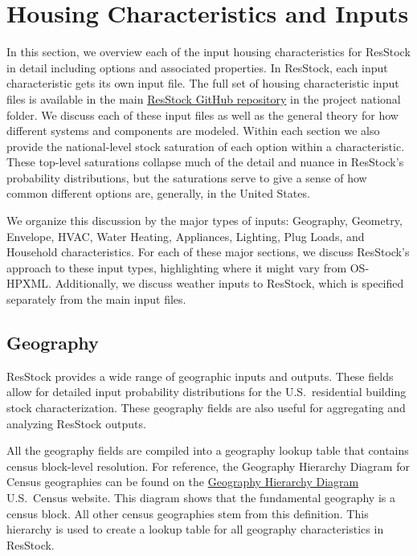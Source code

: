 \chapter{Housing Characteristics and Inputs} \label{sec:resstock_inputs}

In this section, we overview each of the input housing characteristics for ResStock in detail including options and associated properties. In ResStock, each input characteristic gets its own input file. The full set of housing characteristic input files is available in the main \href{https://github.com/NREL/resstock/releases/tag/2025_Release_1}{ResStock GitHub repository} in the project national folder. We discuss each of these input files as well as the general theory for how different systems and components are modeled. Within each section we also provide the national-level stock saturation of each option within a characteristic. These top-level saturations collapse much of the detail and nuance in ResStock's probability distributions, but the saturations serve to give a sense of how common different options are, generally, in the United States.

We organize this discussion by the major types of inputs: Geography, Geometry, Envelope, HVAC, Water Heating, Appliances, Lighting, Plug Loads, and Household characteristics. For each of these major sections, we discuss ResStock's approach to these input types, highlighting where it might vary from OS-HPXML. Additionally, we discuss weather inputs to ResStock, which is specified separately from the main input files.

\section{Geography}
ResStock provides a wide range of geographic inputs and outputs. These fields allow for detailed input probability distributions for the U.S.~residential building stock characterization. These geography fields are also useful for aggregating and analyzing ResStock outputs.

All the geography fields are compiled into a geography lookup table that contains census block-level resolution. For reference, the Geography Hierarchy Diagram for Census geographies can be found on the \href{https://www2.census.gov/geo/pdfs/reference/geodiagram.pdf}{Geography Hierarchy Diagram} U.S.~Census website. This diagram shows that the fundamental geography is a census block. All other census geographies stem from this definition. This hierarchy is used to create a lookup table for all geography characteristics in ResStock.

